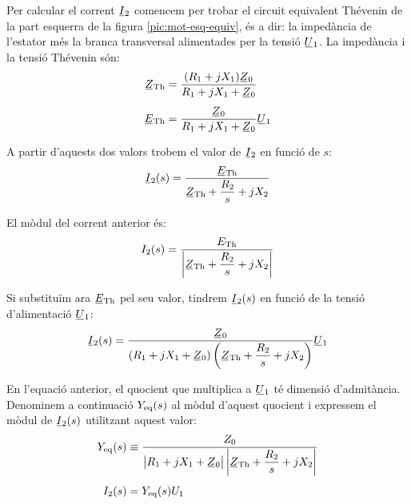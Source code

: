 Per calcular el corrent $\cmplx{I}_2$ comencem per trobar el circuit equivalent Thévenin de la part esquerra de la figura \vref{pic:mot-esq-equiv}, és a dir: la impedància de l'estator més la branca transversal alimentades per la tensió $\cmplx{U}_1$. La impedància i la tensió Thévenin són:
\begin{subequations}
\begin{align}
    \cmplx{Z}\ped{Th} &= \frac{(R_1 + j X_1) \cmplx{Z}_0}{R_1 + j X_1 + \cmplx{Z}_0} \label{eq:mot-ZTh} \\[1ex]
    \cmplx{E}\ped{Th} &= \frac{\cmplx{Z}_0}{R_1 + j X_1 + \cmplx{Z}_0} \cmplx{U}_1 \label{eq:mot-ETh}
\end{align}
\end{subequations}

A partir d'aquests dos valors trobem el valor de $\cmplx{I}_2$ en funció de $s$:
\begin{equation}
    \cmplx{I}_2(s) = \frac{\cmplx{E}\ped{Th}}{\cmplx{Z}\ped{Th} + \dfrac{R_2}{s} + j X_2}
\end{equation}

El mòdul del corrent anterior és:
\begin{equation}
    I_2(s) = \frac{E\ped{Th}}{\left|\cmplx{Z}\ped{Th} + \dfrac{R_2}{s} + j X_2\right|} \label{eq-mot-I2}
\end{equation}

Si substituïm  ara $\cmplx{E}\ped{Th}$ pel seu valor, tindrem $\cmplx{I}_2(s)$ en funció de la tensió d'alimentació $\cmplx{U}_1$:
\begin{equation}
    \cmplx{I}_2(s) = \frac{\cmplx{Z}_0}{(R_1 + j X_1 + \cmplx{Z}_0)\left(\cmplx{Z}\ped{Th} + \dfrac{R_2}{s} + j X_2\right)} \cmplx{U}_1\label{eq:mot-I2}
\end{equation}

En l'equació anterior, el quocient que multiplica a $\cmplx{U}_1$ té dimensió d'admitància. Denominem a continuació $Y_\mathrm{eq}(s)$ al mòdul d'aquest quocient i expressem el mòdul de $\cmplx{I}_2(s)$ utilitzant aquest valor:
\begin{subequations}
\begin{align}
    Y\ped{eq}(s) &\equiv \frac{Z_0}{\big|R_1 + j X_1 + \cmplx{Z}_0\big| \left|\cmplx{Z}\ped{Th} + \dfrac{R_2}{s} + j X_2\right|}\label{eq:mot-Yeq}  \\[1ex]
    I_2(s) &= Y\ped{eq}(s) U_1
\end{align}
\end{subequations}


